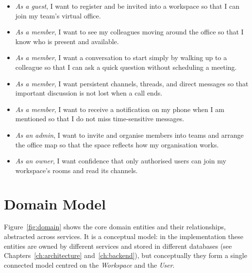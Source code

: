 \begin{itemize}
  \item \emph{As a guest}, I want to register and be invited into a workspace so
  that I can join my team's virtual office.
  \item \emph{As a member}, I want to see my colleagues moving around the office
  so that I know who is present and available.
  \item \emph{As a member}, I want a conversation to start simply by walking up
  to a colleague so that I can ask a quick question without scheduling a meeting.
  \item \emph{As a member}, I want persistent channels, threads, and direct
  messages so that important discussion is not lost when a call ends.
  \item \emph{As a member}, I want to receive a notification on my phone when I am
  mentioned so that I do not miss time-sensitive messages.
  \item \emph{As an admin}, I want to invite and organise members into teams and
  arrange the office map so that the space reflects how my organisation works.
  \item \emph{As an owner}, I want confidence that only authorised users can join
  my workspace's rooms and read its channels.
\end{itemize}

\section{Domain Model}
\label{sec:domain}

Figure~\ref{fig:domain} shows the core domain entities and their relationships,
abstracted across services. It is a conceptual model: in the implementation these
entities are owned by different services and stored in different databases (see
Chapters~\ref{ch:architecture} and~\ref{ch:backend}), but conceptually they form
a single connected model centred on the \emph{Workspace} and the \emph{User}.


